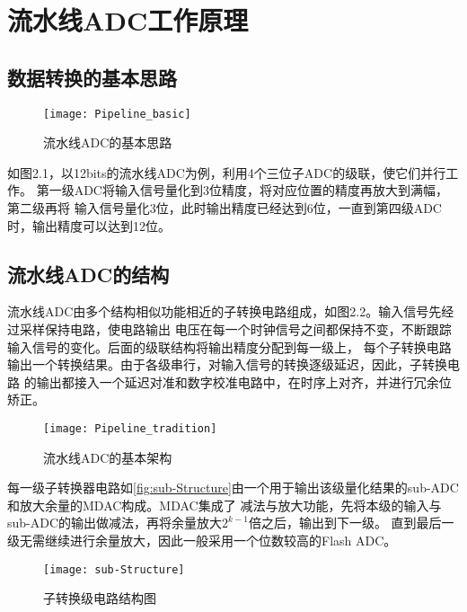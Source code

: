 \newpage

\section{流水线ADC工作原理}
\subsection{数据转换的基本思路}
\begin{figure}[ht]
    \centering
    \texttt{[image: Pipeline\_basic]}
    \caption{\label{fig:pip-basic}流水线ADC的基本思路}
\end{figure}
如图2.1，以12bits的流水线ADC为例，利用4个三位子ADC的级联，使它们并行工作。
第一级ADC将输入信号量化到3位精度，将对应位置的精度再放大到满幅，第二级再将
输入信号量化3位，此时输出精度已经达到6位，一直到第四级ADC时，输出精度可以达到12位。

\subsection{流水线ADC的结构}
流水线ADC由多个结构相似功能相近的子转换电路组成，如图2.2。输入信号先经过采样保持电路，使电路输出
电压在每一个时钟信号之间都保持不变，不断跟踪输入信号的变化。后面的级联结构将输出精度分配到每一级上，
每个子转换电路输出一个转换结果。由于各级串行，对输入信号的转换逐级延迟，因此，子转换电路
的输出都接入一个延迟对准和数字校准电路中，在时序上对齐，并进行冗余位矫正。
\begin{figure}[ht]
    \centering
    \texttt{[image: Pipeline\_tradition]}
    \caption{\label{fig:pip-tradition}流水线ADC的基本架构}
\end{figure}
\par 每一级子转换器电路如\autoref{fig:sub-Structure}由一个用于输出该级量化结果的sub-ADC和放大余量的MDAC构成。MDAC集成了
减法与放大功能，先将本级的输入与sub-ADC的输出做减法，再将余量放大$ 2^{k-1} $倍之后，输出到下一级。
直到最后一级无需继续进行余量放大，因此一般采用一个位数较高的Flash ADC。
\begin{figure}[ht]
    \centering
    \texttt{[image: sub-Structure]}
    \caption{\label{fig:sub-Structure}子转换级电路结构图}
\end{figure}
